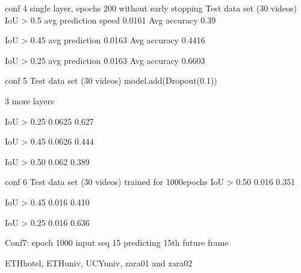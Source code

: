 



conf 4  single layer, epochs 200 without early stopping
Test data set (30 videos)
IoU > 0.5
avg prediction speed 0.0161
Avg accuracy 0.39

IoU > 0.45
avg prediction 0.0163
Avg accuracy 0.4416

IoU > 0.25
avg prediction 0.0163
Avg accuracy 0.6603





conf 5 Test data set (30 videos)
model.add(Dropout(0.1))

3 more layers

IoU > 0.25 0.0625 0.627

IoU > 0.45 0.0626 0.444

IoU > 0.50 0.062 0.389

conf 6 Test data set (30 videos)
trained for 1000epochs
IoU > 0.50
0.016 0.351

IoU > 0.45
0.016 0.410

IoU > 0.25
0.016 0.636


Conf7:
epoch 1000
input seq 15
predicting 15th future frame

ETHhotel, ETHuniv, UCYuniv,
zara01 and zara02




